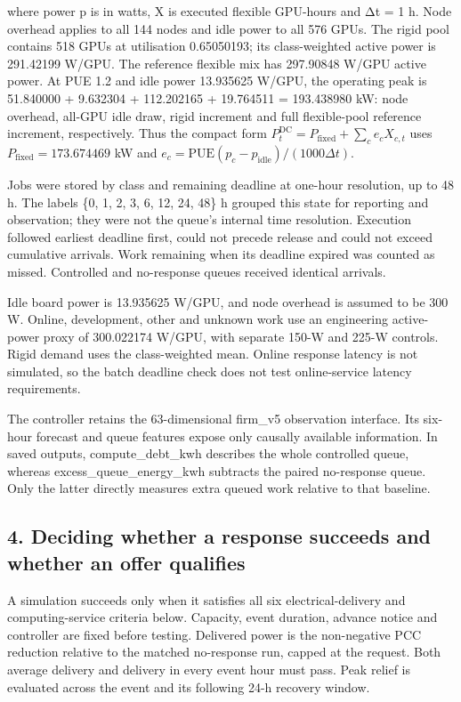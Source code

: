 \documentclass[10pt,a4paper]{article}
\begin{document}
where power p is in watts, X is executed flexible GPU-hours and Δt = 1 h. Node overhead applies to all 144 nodes and idle power to all 576 GPUs. The rigid pool contains 518 GPUs at utilisation 0.65050193; its class-weighted active power is 291.42199 W/GPU. The reference flexible mix has 297.90848 W/GPU active power. At PUE 1.2 and idle power 13.935625 W/GPU, the operating peak is 51.840000 + 9.632304 + 112.202165 + 19.764511 = 193.438980 kW: node overhead, all-GPU idle draw, rigid increment and full flexible-pool reference increment, respectively. Thus the compact form \(P^{\mathrm{DC}}_t=P_{\mathrm{fixed}}+\sum_c e_cX_{c,t}\) uses \(P_{\mathrm{fixed}}=173.674469\) kW and \(e_c=\mathrm{PUE}(p_c-p_{\mathrm{idle}})/(1000\Delta t)\).


Jobs were stored by class and remaining deadline at one-hour resolution, up to 48 h. The labels \{0, 1, 2, 3, 6, 12, 24, 48\} h grouped this state for reporting and observation; they were not the queue's internal time resolution. Execution followed earliest deadline first, could not precede release and could not exceed cumulative arrivals. Work remaining when its deadline expired was counted as missed. Controlled and no-response queues received identical arrivals.


Idle board power is 13.935625 W/GPU, and node overhead is assumed to be 300 W. Online, development, other and unknown work use an engineering active-power proxy of 300.022174 W/GPU, with separate 150-W and 225-W controls. Rigid demand uses the class-weighted mean. Online response latency is not simulated, so the batch deadline check does not test online-service latency requirements.


The controller retains the 63-dimensional firm\_v5 observation interface. Its six-hour forecast and queue features expose only causally available information. In saved outputs, compute\_debt\_kwh describes the whole controlled queue, whereas excess\_queue\_energy\_kwh subtracts the paired no-response queue. Only the latter directly measures extra queued work relative to that baseline.


\subsection{4. Deciding whether a response succeeds and whether an offer qualifies}

A simulation succeeds only when it satisfies all six electrical-delivery and computing-service criteria below. Capacity, event duration, advance notice and controller are fixed before testing. Delivered power is the non-negative PCC reduction relative to the matched no-response run, capped at the request. Both average delivery and delivery in every event hour must pass. Peak relief is evaluated across the event and its following 24-h recovery window.
\end{document}
